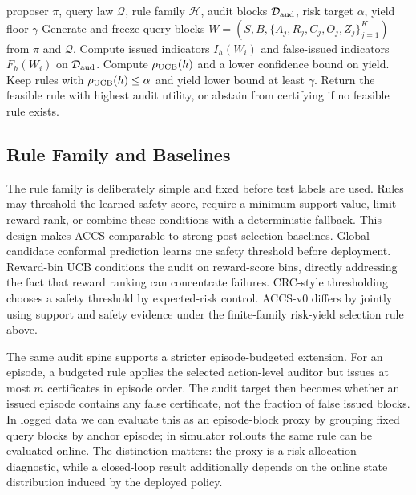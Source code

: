 \documentclass[letterpaper]{article}
\begin{document}
\begin{algorithm}[t]
\caption{ACCS audit for fixed query blocks}
\label{alg:accs}
\begin{algorithmic}[1]
\REQUIRE proposer $\pi$, query law $\mathcal{Q}$, rule family $\mathcal{H}$,
audit blocks $\mathcal{D}_{\rm aud}$, risk target $\alpha$, yield floor
$\gamma$
\STATE Generate and freeze query blocks $W=(S,B,\{A_j,R_j,C_j,O_j,Z_j\}_{j=1}^K)$
from $\pi$ and $\mathcal{Q}$.
    \STATE Compute issued indicators $I_h(W_i)$ and false-issued indicators
    $F_h(W_i)$ on $\mathcal{D}_{\rm aud}$.
    \STATE Compute $\rho_{\rm UCB}(h)$ and a lower confidence bound on yield.
\ENDFOR
\STATE Keep rules with $\rho_{\rm UCB}(h)\le\alpha$ and yield lower bound
at least $\gamma$.
\STATE Return the feasible rule with highest audit utility, or abstain from
certifying if no feasible rule exists.
\end{algorithmic}
\end{algorithm}

\subsection{Rule Family and Baselines}

The rule family is deliberately simple and fixed before test labels are used.
Rules may threshold the learned safety score, require a minimum support value,
limit reward rank, or combine these conditions with a deterministic fallback.
This design makes ACCS comparable to strong post-selection baselines. Global
candidate conformal prediction learns one safety threshold before deployment.
Reward-bin UCB conditions the audit on reward-score bins, directly addressing
the fact that reward ranking can concentrate failures. CRC-style thresholding
chooses a safety threshold by expected-risk control. ACCS-v0 differs by
jointly using support and safety evidence under the finite-family risk-yield
selection rule above.

The same audit spine supports a stricter episode-budgeted extension. For an
episode, a budgeted rule applies the selected action-level auditor but issues
at most $m$ certificates in episode order. The audit target then becomes
whether an issued episode contains any false certificate, not the fraction of
false issued blocks. In logged data we can evaluate this as an episode-block
proxy by grouping fixed query blocks by anchor episode; in simulator rollouts
the same rule can be evaluated online. The distinction matters: the proxy is a
risk-allocation diagnostic, while a closed-loop result additionally depends on
the online state distribution induced by the deployed policy.
\end{document}
